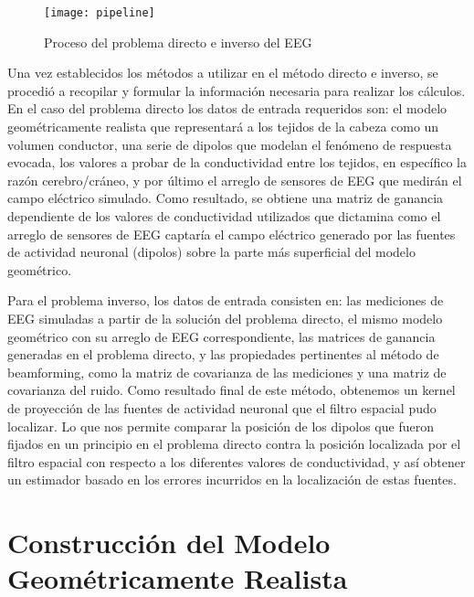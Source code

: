 \begin{figure}[tb]
	\centering
	\texttt{[image: pipeline]}
	\caption{Proceso del problema directo e inverso del EEG
		}
	\label{fig:methodology:pipeline}
\end{figure}

Una vez establecidos los métodos a utilizar en el método directo e inverso, se procedió a recopilar y formular la información necesaria para realizar los cálculos.
En el caso del problema directo los datos de entrada requeridos son: el modelo geométricamente realista que representará a los tejidos de la cabeza como un volumen conductor, una serie de dipolos que modelan el fenómeno de respuesta evocada, los valores a probar de la conductividad entre los tejidos, en específico la razón cerebro/cráneo, y por último el arreglo de sensores de EEG que medirán el campo eléctrico simulado.
Como resultado, se obtiene una matriz de ganancia dependiente de los valores de conductividad utilizados que dictamina como el arreglo de sensores de EEG captaría el campo eléctrico generado por las fuentes de actividad neuronal (dipolos) sobre la parte más superficial del modelo geométrico.

Para el problema inverso, los datos de entrada consisten en: las mediciones de EEG simuladas a partir de la solución del problema directo, el mismo modelo geométrico con su arreglo de EEG correspondiente, las matrices de ganancia generadas en el problema directo, y las propiedades pertinentes al método de beamforming, como la matriz de covarianza de las mediciones y una matriz de covarianza del ruido.
Como resultado final de este método, obtenemos un kernel de proyección de las fuentes de actividad neuronal que el filtro espacial pudo localizar.
Lo que nos permite comparar la posición de los dipolos que fueron fijados en un principio en el problema directo contra la posición localizada por el filtro espacial con respecto a los diferentes valores de conductividad, y así obtener un estimador basado en los errores incurridos en la localización de estas fuentes.

\section{Construcción del Modelo Geométricamente Realista}
\label{sec:methodology:model}

